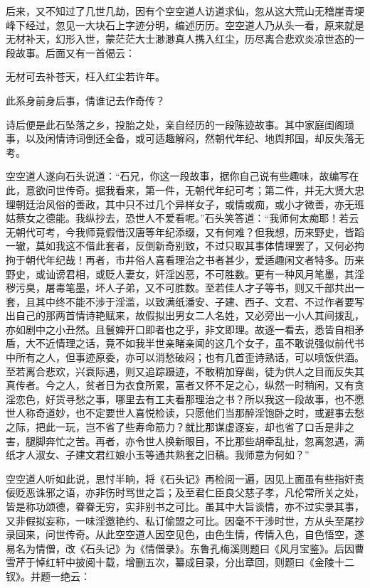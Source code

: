 后来，又不知过了几世几劫，因有个空空道人访道求仙，忽从这大荒山无稽崖青埂峰下经过，忽见一大块石上字迹分明，编述历历。空空道人乃从头一看，原来就是无材补天，幻形入世，蒙茫茫大士渺渺真人携入红尘，历尽离合悲欢炎凉世态的一段故事。后面又有一首偈云：

无材可去补苍天，枉入红尘若许年。

此系身前身后事，倩谁记去作奇传？

诗后便是此石坠落之乡，投胎之处，亲自经历的一段陈迹故事。其中家庭闺阁琐事，以及闲情诗词倒还全备，或可适趣解闷，然朝代年纪、地舆邦国，却反失落无考。

空空道人遂向石头说道：“石兄，你这一段故事，据你自己说有些趣味，故编写在此，意欲问世传奇。据我看来，第一件，无朝代年纪可考；第二件，并无大贤大忠理朝廷治风俗的善政，其中只不过几个异样女子，或情或痴，或小才微善，亦无班姑蔡女之德能。我纵抄去，恐世人不爱看呢。”石头笑答道：“我师何太痴耶！若云无朝代可考，今我师竟假借汉唐等年纪添缀，又有何难？但我想，历来野史，皆蹈一辙，莫如我这不借此套者，反倒新奇别致，不过只取其事体情理罢了，又何必拘拘于朝代年纪哉！再者，市井俗人喜看理治之书者甚少，爱适趣闲文者特多。历来野史，或讪谤君相，或贬人妻女，奸淫凶恶，不可胜数。更有一种风月笔墨，其淫秽污臭，屠毒笔墨，坏人子弟，又不可胜数。至若佳人才子等书，则又千部共出一套，且其中终不能不涉于淫滥，以致满纸潘安、子建、西子、文君、不过作者要写出自己的那两首情诗艳赋来，故假拟出男女二人名姓，又必旁出一小人其间拨乱，亦如剧中之小丑然。且鬟婢开口即者也之乎，非文即理。故逐一看去，悉皆自相矛盾，大不近情理之话，竟不如我半世亲睹亲闻的这几个女子，虽不敢说强似前代书中所有之人，但事迹原委，亦可以消愁破闷；也有几首歪诗熟话，可以喷饭供酒。至若离合悲欢，兴衰际遇，则又追踪蹑迹，不敢稍加穿凿，徒为供人之目而反失其真传者。今之人，贫者日为衣食所累，富者又怀不足之心，纵然一时稍闲，又有贪淫恋色，好货寻愁之事，哪里去有工夫看那理治之书？所以我这一段故事，也不愿世人称奇道妙，也不定要世人喜悦检读，只愿他们当那醉淫饱卧之时，或避事去愁之际，把此一玩，岂不省了些寿命筋力？就比那谋虚逐妄，却也省了口舌是非之害，腿脚奔忙之苦。再者，亦令世人换新眼目，不比那些胡牵乱扯，忽离忽遇，满纸才人淑女、子建文君红娘小玉等通共熟套之旧稿。我师意为何如？”

空空道人听如此说，思忖半晌，将《石头记》再检阅一遍，因见上面虽有些指奸责佞贬恶诛邪之语，亦非伤时骂世之旨；及至君仁臣良父慈子孝，凡伦常所关之处，皆是称功颂德，眷眷无穷，实非别书之可比。虽其中大旨谈情，亦不过实录其事，又非假拟妄称，一味淫邀艳约、私订偷盟之可比。因毫不干涉时世，方从头至尾抄录回来，问世传奇。从此空空道人因空见色，由色生情，传情入色，自色悟空，遂易名为情僧，改《石头记》为《情僧录》。东鲁孔梅溪则题曰《风月宝鉴》。后因曹雪芹于悼红轩中披阅十载，增删五次，纂成目录，分出章回，则题曰《金陵十二钗》。并题一绝云：

